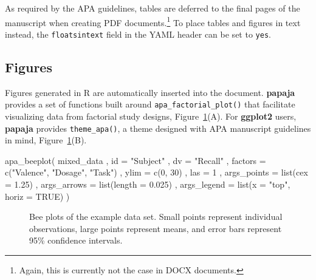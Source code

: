 \documentclass[
  ,man,floatsintext]{apa6}
\newenvironment{Shaded}{\begin{snugshade}}{\end{snugshade}}
\newcommand{\AttributeTok}[1]{\textcolor[rgb]{0.77,0.63,0.00}{#1}}
\newcommand{\ConstantTok}[1]{\textcolor[rgb]{0.00,0.00,0.00}{#1}}
\newcommand{\DecValTok}[1]{\textcolor[rgb]{0.00,0.00,0.81}{#1}}
\newcommand{\FloatTok}[1]{\textcolor[rgb]{0.00,0.00,0.81}{#1}}
\newcommand{\FunctionTok}[1]{\textcolor[rgb]{0.00,0.00,0.00}{#1}}
\newcommand{\NormalTok}[1]{#1}
\newcommand{\StringTok}[1]{\textcolor[rgb]{0.31,0.60,0.02}{#1}}
\begin{document}
As required by the APA guidelines, tables are deferred to the final pages of the manuscript when creating PDF documents.\footnote{Again, this is currently not the case in DOCX documents.}
To place tables and figures in text instead, the \texttt{floatsintext} field in the YAML header can be set to \texttt{yes}.

\hypertarget{figures}{%
\subsection{Figures}\label{figures}}

Figures generated in R are automatically inserted into the document.
\textbf{papaja} provides a set of functions built around \texttt{apa\_factorial\_plot()} that facilitate visualizing data from factorial study designs, Figure~\ref{fig:beeplots}(A).
For \textbf{ggplot2} users, \textbf{papaja} provides \texttt{theme\_apa()}, a theme designed with APA manuscript guidelines in mind, Figure~\ref{fig:beeplots}(B).

\begin{Shaded}
\begin{Highlighting}[]
\FunctionTok{apa\_beeplot}\NormalTok{(}
\NormalTok{  mixed\_data}
\NormalTok{  , }\AttributeTok{id =} \StringTok{"Subject"}
\NormalTok{  , }\AttributeTok{dv =} \StringTok{"Recall"}
\NormalTok{  , }\AttributeTok{factors =} \FunctionTok{c}\NormalTok{(}\StringTok{"Valence"}\NormalTok{, }\StringTok{"Dosage"}\NormalTok{, }\StringTok{"Task"}\NormalTok{) }
\NormalTok{  , }\AttributeTok{ylim =} \FunctionTok{c}\NormalTok{(}\DecValTok{0}\NormalTok{, }\DecValTok{30}\NormalTok{)}
\NormalTok{  , }\AttributeTok{las =} \DecValTok{1}
\NormalTok{  , }\AttributeTok{args\_points =} \FunctionTok{list}\NormalTok{(}\AttributeTok{cex =} \FloatTok{1.25}\NormalTok{)}
\NormalTok{  , }\AttributeTok{args\_arrows =} \FunctionTok{list}\NormalTok{(}\AttributeTok{length =} \FloatTok{0.025}\NormalTok{)}
\NormalTok{  , }\AttributeTok{args\_legend =} \FunctionTok{list}\NormalTok{(}\AttributeTok{x =} \StringTok{"top"}\NormalTok{, }\AttributeTok{horiz =} \ConstantTok{TRUE}\NormalTok{)}
\NormalTok{)}
\end{Highlighting}
\end{Shaded}







\begin{figure}

{\centering {}\newline{}

}

\caption{Bee plots of the example data set. Small points represent individual observations, large points represent means, and error bars represent 95\% confidence intervals.}\label{fig:beeplots}
\end{figure}
\end{document}
